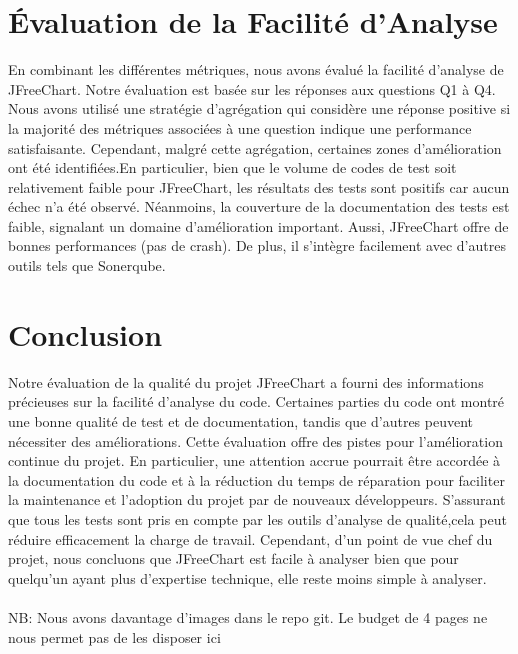 \documentclass{proc}
\begin{document}
\section{Évaluation de la Facilité d'Analyse}
En combinant les différentes métriques, nous avons évalué la facilité d'analyse de JFreeChart. Notre évaluation est basée sur les réponses aux questions Q1 à Q4. Nous avons utilisé une stratégie d'agrégation qui considère une réponse positive si la majorité des métriques associées à une question indique une performance satisfaisante. Cependant, malgré cette agrégation, certaines zones d'amélioration ont été identifiées.En particulier, bien que le volume de codes de test soit relativement faible pour JFreeChart, les résultats des tests sont positifs car aucun échec n'a été observé. Néanmoins, la couverture de la documentation des tests est faible, signalant un domaine d'amélioration important. Aussi, JFreeChart offre de bonnes performances (pas de crash). De plus, il s'intègre facilement avec d'autres outils tels que Sonerqube. 

\section{Conclusion}
Notre évaluation de la qualité du projet JFreeChart a fourni des informations précieuses sur la facilité d'analyse du code. Certaines parties du code ont montré une bonne qualité de test et de documentation, tandis que d'autres peuvent nécessiter des améliorations. Cette évaluation offre des pistes pour l'amélioration continue du projet. En particulier, une attention accrue pourrait être accordée à la documentation du code et à la réduction du temps de réparation pour faciliter la maintenance et l'adoption du projet par de nouveaux développeurs. S'assurant que tous les tests sont pris en compte par les outils d'analyse de qualité,cela peut réduire efficacement la charge de travail. Cependant, d'un point de vue chef du projet, nous concluons que JFreeChart est facile à analyser bien que pour quelqu'un ayant plus d'expertise technique, elle reste moins simple à analyser.
\\\\
{NB: Nous avons davantage d'images dans le repo git. Le budget de 4 pages ne nous permet pas de les disposer ici}


  
\end{document}
